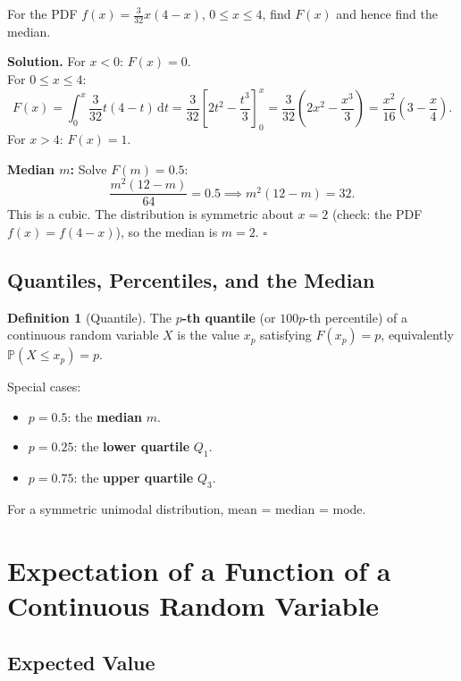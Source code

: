 \documentclass[12pt, a4paper, oneside]{book}
\theoremstyle{definition}
\newtheorem{definition}{Definition}[section]
\theoremstyle{plain}
\theoremstyle{remark}
\newcommand{\Prob}{\mathbb{P}}
\newenvironment{solution}
  {\par\medskip\noindent\textbf{Solution.}\quad}
  {\hfill$\square$\par\medskip}
\begin{document}
\begin{workedexample}
For the PDF $f(x) = \frac{3}{32}x(4-x)$, $0 \le x \le 4$, find $F(x)$ and
hence find the median.

\begin{solution}
For $x < 0$: $F(x)=0$.\\
For $0 \le x \le 4$:
\[
  F(x) = \int_0^x \frac{3}{32}t(4-t)\,\mathrm{d}t
  = \frac{3}{32}\left[2t^2 - \frac{t^3}{3}\right]_0^x
  = \frac{3}{32}\!\left(2x^2 - \frac{x^3}{3}\right)
  = \frac{x^2}{16}\!\left(3 - \frac{x}{4}\right).
\]
For $x > 4$: $F(x) = 1$.

\medskip
\textbf{Median $m$:} Solve $F(m) = 0.5$:
\[
  \frac{m^2(12 - m)}{64} = 0.5 \implies m^2(12-m) = 32.
\]
This is a cubic.  The distribution is symmetric about $x=2$ (check: the PDF
$f(x) = f(4-x)$), so the median is $m = 2$.
\end{solution}
\end{workedexample}

\subsection{Quantiles, Percentiles, and the Median}

\begin{definition}[Quantile]
The \textbf{$p$-th quantile} (or $100p$-th percentile) of a continuous random
variable $X$ is the value $x_p$ satisfying $F(x_p) = p$,
equivalently $\Prob(X \le x_p) = p$.
\end{definition}

Special cases:
\begin{itemize}
  \item $p = 0.5$: the \textbf{median} $m$.
  \item $p = 0.25$: the \textbf{lower quartile} $Q_1$.
  \item $p = 0.75$: the \textbf{upper quartile} $Q_3$.
\end{itemize}

For a symmetric unimodal distribution, mean = median = mode.

\section{Expectation of a Function of a Continuous Random Variable}
\label{sec:egx}

\subsection{Expected Value}
\end{document}
